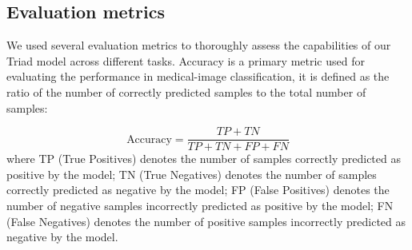 \subsection{Evaluation metrics}

We used several evaluation metrics to thoroughly assess the capabilities of our Triad model across different tasks. Accuracy is a primary metric used for evaluating the performance in medical-image classification, it is defined as the ratio of the number of correctly predicted samples to the total number of samples:

\begin{equation}
	\label{e:acc}
	\text{Accuracy} = \frac{TP + TN}{TP + TN + FP + FN}
\end{equation}
where TP (True Positives) denotes the number of samples correctly predicted as positive by the model; TN (True Negatives) denotes the number of samples correctly predicted as negative by the model; FP (False Positives) denotes the number of negative samples incorrectly predicted as positive by the model; FN (False Negatives) denotes the number of positive samples incorrectly predicted as negative by the model.

